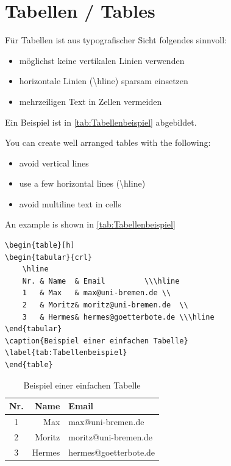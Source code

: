 \documentclass[]{iat}
\begin{document}
\section{Tabellen / Tables}
Für Tabellen ist aus typografischer Sicht folgendes sinnvoll:
\begin{itemize}
	\item möglichst keine vertikalen Linien verwenden
	\item horizontale Linien (\textbackslash hline) sparsam einsetzen
	\item mehrzeiligen Text in Zellen vermeiden
\end{itemize}
Ein Beispiel ist in \autoref{tab:Tabellenbeispiel} abgebildet.
\par
You can create well arranged tables with the following:
\begin{itemize}
	\item avoid vertical lines
	\item use a few horizontal lines (\textbackslash hline)
	\item avoid multiline text in cells
\end{itemize}
An example is shown in \autoref{tab:Tabellenbeispiel}
\par
\begin{lstlisting}
\begin{table}[h]
\begin{tabular}{crl}
	\hline
	Nr.	& Name	& Email			\\\hline
	1	& Max	& max@uni-bremen.de	\\
	2	& Moritz& moritz@uni-bremen.de	\\
	3	& Hermes& hermes@goetterbote.de	\\\hline
\end{tabular}
\caption{Beispiel einer einfachen Tabelle}
\label{tab:Tabellenbeispiel}
\end{table}
\end{lstlisting}
\begin{table}[h]
	\begin{tabular}{crl}
		\hline
		Nr.	& Name	& Email			\\\hline
		1	& Max	& max@uni-bremen.de	\\
		2	& Moritz& moritz@uni-bremen.de	\\
		3	& Hermes& hermes@goetterbote.de	\\\hline
	\end{tabular}
	\caption{Beispiel einer einfachen Tabelle}
	\label{tab:Tabellenbeispiel}
\end{table}
\end{document}
